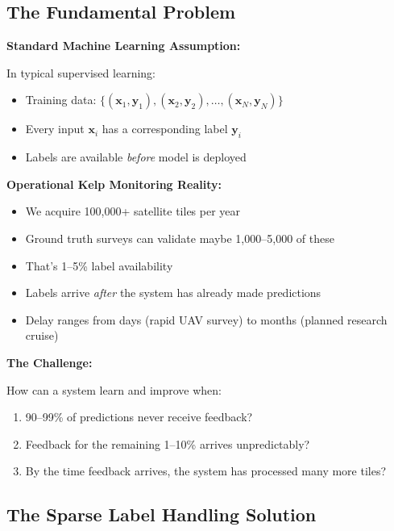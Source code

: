 \documentclass[11pt]{article}
\begin{document}
\subsection{The Fundamental Problem}

\textbf{Standard Machine Learning Assumption:}

In typical supervised learning:
\begin{itemize}
    \item Training data: $\{(\mathbf{x}_1, \mathbf{y}_1), (\mathbf{x}_2, \mathbf{y}_2), \ldots, (\mathbf{x}_N, \mathbf{y}_N)\}$
    \item Every input $\mathbf{x}_i$ has a corresponding label $\mathbf{y}_i$
    \item Labels are available \textit{before} model is deployed
\end{itemize}

\textbf{Operational Kelp Monitoring Reality:}

\begin{itemize}
    \item We acquire 100,000+ satellite tiles per year
    \item Ground truth surveys can validate maybe 1,000--5,000 of these
    \item That's 1--5\% label availability
    \item Labels arrive \textit{after} the system has already made predictions
    \item Delay ranges from days (rapid UAV survey) to months (planned research cruise)
\end{itemize}

\textbf{The Challenge:}

How can a system learn and improve when:
\begin{enumerate}
    \item 90--99\% of predictions never receive feedback?
    \item Feedback for the remaining 1--10\% arrives unpredictably?
    \item By the time feedback arrives, the system has processed many more tiles?
\end{enumerate}

\subsection{The Sparse Label Handling Solution}
\end{document}
